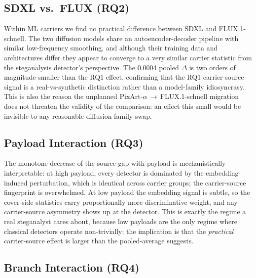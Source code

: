 \documentclass[10pt,twocolumn,a4paper]{article}
\begin{document}
\subsection{SDXL vs.\ FLUX (RQ2)}

Within ML carriers we find no practical difference between SDXL and FLUX.1-schnell. The two diffusion models share an autoencoder-decoder pipeline with similar low-frequency smoothing, and although their training data and architectures differ they appear to converge to a very similar carrier statistic from the steganalysis detector's perspective. The 0.0004 pooled $\Delta$ is two orders of magnitude smaller than the RQ1 effect, confirming that the RQ1 carrier-source signal is a real-vs-synthetic distinction rather than a model-family idiosyncrasy. This is also the reason the unplanned PixArt-$\alpha$\,$\to$\,FLUX.1-schnell migration does not threaten the validity of the comparison: an effect this small would be invisible to any reasonable diffusion-family swap.

\subsection{Payload Interaction (RQ3)}

The monotone decrease of the source gap with payload is mechanistically interpretable: at high payload, every detector is dominated by the embedding-induced perturbation, which is identical across carrier groups; the carrier-source fingerprint is overwhelmed. At low payload the embedding signal is subtle, so the cover-side statistics carry proportionally more discriminative weight, and any carrier-source asymmetry shows up at the detector. This is exactly the regime a real steganalyst cares about, because low payloads are the only regime where classical detectors operate non-trivially; the implication is that the \emph{practical} carrier-source effect is larger than the pooled-average suggests.

\subsection{Branch Interaction (RQ4)}
\label{sec:rq4discussion}
\end{document}
